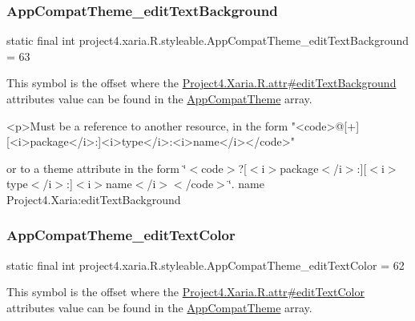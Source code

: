 \subsubsection{\texorpdfstring{App\+Compat\+Theme\+\_\+edit\+Text\+Background}{AppCompatTheme\_editTextBackground}}
{\footnotesize\ttfamily static final int project4.\+xaria.\+R.\+styleable.\+App\+Compat\+Theme\+\_\+edit\+Text\+Background = 63\hspace{0.3cm}{\ttfamily [static]}}

This symbol is the offset where the \hyperlink{}{Project4.\+Xaria.\+R.\+attr\#edit\+Text\+Background} attribute\textquotesingle{}s value can be found in the \hyperlink{classproject4_1_1xaria_1_1R_1_1styleable_aad8bec413e2350f9404e6ff0e831a85d}{App\+Compat\+Theme} array.

\begin{DoxyVerb}      <p>Must be a reference to another resource, in the form "<code>@[+][<i>package</i>:]<i>type</i>:<i>name</i></code>"
\end{DoxyVerb}
 or to a theme attribute in the form \char`\"{}$<$code$>$?\mbox{[}$<$i$>$package$<$/i$>$\+:\mbox{]}\mbox{[}$<$i$>$type$<$/i$>$\+:\mbox{]}$<$i$>$name$<$/i$>$$<$/code$>$\char`\"{}.  name Project4.\+Xaria\+:edit\+Text\+Background \mbox{\label{classproject4_1_1xaria_1_1R_1_1styleable_a8fff9c294080610c2f55e32050dda6d5}} 
\subsubsection{\texorpdfstring{App\+Compat\+Theme\+\_\+edit\+Text\+Color}{AppCompatTheme\_editTextColor}}
{\footnotesize\ttfamily static final int project4.\+xaria.\+R.\+styleable.\+App\+Compat\+Theme\+\_\+edit\+Text\+Color = 62\hspace{0.3cm}{\ttfamily [static]}}

This symbol is the offset where the \hyperlink{}{Project4.\+Xaria.\+R.\+attr\#edit\+Text\+Color} attribute\textquotesingle{}s value can be found in the \hyperlink{classproject4_1_1xaria_1_1R_1_1styleable_aad8bec413e2350f9404e6ff0e831a85d}{App\+Compat\+Theme} array.

